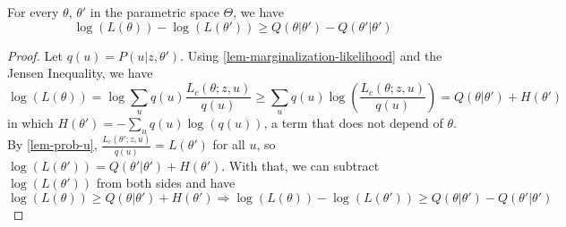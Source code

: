 \begin{proposition}
  For every $\theta$, $\theta'$ in the parametric space $\Theta$, we have
  \begin{equation*}
    \log(L(\theta)) - \log(L(\theta')) \ge Q(\theta|\theta') - Q(\theta'|\theta')
  \end{equation*}
\end{proposition}

\begin{proof}
  Let $q(u) = P(u|z,\theta')$. Using \autoref{lem-marginalization-likelihood} and the Jensen Inequality, we have
  \begin{equation*}
    \log(L(\theta)) = \log\sum_{u}q(u)\frac{L_{c}(\theta;z,u)}{q(u)} \ge \sum_{u}q(u)\log\left(\frac{L_{c}(\theta;z,u)}{q(u)}\right) = Q(\theta|\theta') + H(\theta')
  \end{equation*}
  \noindent in which $H(\theta') = - \sum_{u}q(u)\log(q(u))$, a term that does not depend of $\theta$. By \autoref{lem-prob-u}, $\frac{L_{c}(\theta';z,u)}{q(u)} = L(\theta')$ for all $u$, so $\log(L(\theta')) = Q(\theta'|\theta') + H(\theta')$. With that, we can subtract $\log(L(\theta'))$ from both sides and have
  \begin{equation*}
    \log(L(\theta)) \ge Q(\theta|\theta') + H(\theta') \Longrightarrow \log(L(\theta)) - \log(L(\theta')) \ge Q(\theta|\theta') - Q(\theta'|\theta')
  \end{equation*}
\end{proof}
